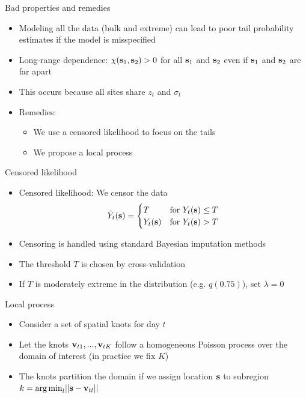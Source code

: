 \documentclass{beamer}
\begin{document}
\begin{frame}{Bad properties and remedies}
	\begin{itemize}\setlength{\itemsep}{1em}
	 	\item Modeling all the data (bulk and extreme) can lead to poor tail probability estimates if the model is misspecified
	 	\item Long-range dependence: $\chi(\mathbf{s}_1,\mathbf{s}_2)>0$ for all $\mathbf{s}_1$ and $\mathbf{s}_2$ even if $\mathbf{s}_1$ and $\mathbf{s}_2$ are far apart
	 	\item This occurs because all sites share $z_t$ and $\sigma_t$
	 	\item Remedies: \vspace{0.5em}
	 	\begin{itemize}\setlength{\itemsep}{0.5em}
		 	\item We use a censored likelihood to focus on the tails
		 	\item We propose a local \skewt{} process
		 \end{itemize}
	\end{itemize}
\end{frame}

\begin{frame}{Censored likelihood}
	\begin{itemize}\setlength{\itemsep}{1em}
		\item Censored likelihood: We censor the data
		$${\tilde Y}_t(\mathbf{s}) =\begin{cases}
			T 		 & \text{for } Y_t(\mathbf{s})\le T\\
		 	Y_t(\mathbf{s}) & \text{for } Y_t(\mathbf{s})>T
		\end{cases}$$
		\item Censoring is handled using standard Bayesian imputation methods
		\item The threshold $T$ is chosen by cross-validation
		\item If $T$ is moderately extreme in the distribution (e.g. $q(0.75)$), set $\lambda = 0$
	\end{itemize}
\end{frame}

\begin{frame}{Local \skewt{} process}
	\begin{itemize}\setlength\itemsep{1em}
    \item Consider a set of spatial knots for day $t$
		\item Let the knots $\mathbf{v}_{t1},...,\mathbf{v}_{tK}$ follow a homogeneous Poisson process over the domain of interest (in practice we fix $K$)
		\item The knots partition the domain if we assign location $\mathbf{s}$ to subregion $k={\mathop{\rm arg\, min}}_{l}||\mathbf{s}-\mathbf{v}_{tl}||$
	\end{itemize}
\end{frame}
\end{document}
